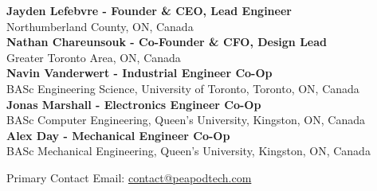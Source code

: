 \scriptsize{
    \textbf{Jayden Lefebvre - Founder \& CEO, Lead Engineer}\\
    Northumberland County, ON, Canada\\
    \vspace{.5cm}
    \textbf{Nathan Chareunsouk - Co-Founder \& CFO, Design Lead}\\Greater Toronto Area, ON, Canada\\
    \vspace{.5cm}
    \textbf{Navin Vanderwert - Industrial Engineer Co-Op}\\
    BASc Engineering Science, University of Toronto, Toronto, ON, Canada\\
    \vspace{.5cm}
    \textbf{Jonas Marshall - Electronics Engineer Co-Op}\\
    BASc Computer Engineering, Queen's University, Kingston, ON, Canada\\
    \vspace{.5cm}
    \textbf{Alex Day - Mechanical Engineer Co-Op}\\
    BASc Mechanical Engineering, Queen's University, Kingston, ON, Canada\\
}

\vspace{.75cm}

Primary Contact Email: \uline{contact@peapodtech.com}